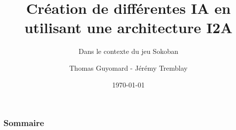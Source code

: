 \documentclass[
	11pt, %
]{beamer}
\title[Initation Recherche]{Création de différentes IA en utilisant une architecture I2A} %
\subtitle{Dans le contexte du jeu Sokoban} %
\author[Thomas Guyomard / Jérémy Tremblay]{Thomas Guyomard - Jérémy Tremblay} %
\institute[]{Université du Littoral Côte d'Opale\\ \smallskip \textit{Encadrant : Jérôme Buisine}} %
\date[\today]{\today} %
\begin{document}

\begin{frame}
	\titlepage %
\end{frame}



\begin{frame}
	\frametitle{Sommaire} %

	\tableofcontents %
\end{frame}



\end{document}
